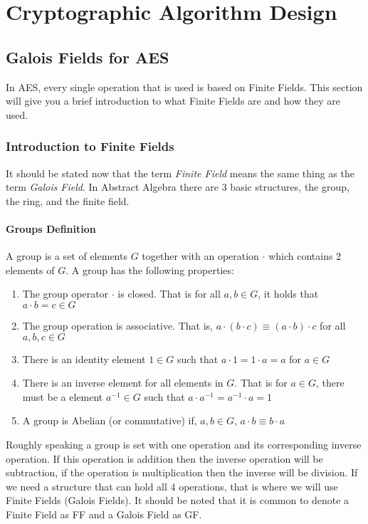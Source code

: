 \section{Cryptographic Algorithm Design}

\subsection{Galois Fields for AES}

In AES, every single operation that is used is based on Finite Fields. This section will give you a brief introduction to what Finite Fields are and how they are used.

\subsubsection{Introduction to Finite Fields}

It should be stated now that the term \textit{Finite Field} means the same thing as the term \textit{Galois Field}. In Abstract Algebra there are 3 basic structures, the group, the ring, and the finite field.

\paragraph{Groups Definition}
A group is a set of elements $G$ together with an operation $\cdot$ which contains $2$ elements of $G$. A group has the following properties:
\begin{enumerate}
\item{The group operator $\cdot$ is closed. That is for all $a,b \in G$, it holds that $a \cdot b = c \in G$}
\item{The group operation is associative. That is, $a \cdot (b \cdot c) \equiv (a \cdot b) \cdot c$ for all $a,b,c \in G$}
\item{There is an identity element $1 \in G$ such that $a \cdot 1 = 1 \cdot a = a$ for $a \in G$}
\item{There is an inverse element for all elements in $G$. That is for $a \in G$, there must be a element $a^{-1} \in G$ such that $a \cdot a^{-1} = a^{-1} \cdot a = 1$}
\item{A group is Abelian (or commutative) if, $a,b \in G$, $a \cdot b \equiv b \cdot a$}
\end{enumerate}

Roughly speaking a group is set with one operation and its corresponding inverse operation. If this operation is addition then the inverse operation will be subtraction, if the operation is multiplication then the inverse will be division. If we need a structure that can hold all 4 operations, that is where we will use Finite Fields (Galois Fields). It should be noted that it is common to denote a Finite Field as FF and a Galois Field as GF. 

